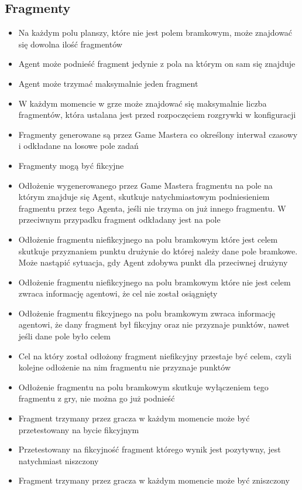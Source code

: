 \documentclass[Dokumentacja.tex]{subfiles}
\begin{document}
\subsection{Fragmenty}
\begin{itemize}
    \item Na każdym polu planszy, które nie jest polem bramkowym, może znajdować się dowolna ilość fragmentów
	\item Agent może podnieść fragment jedynie z pola na którym on sam się znajduje
    \item Agent może trzymać maksymalnie jeden fragment
    \item W każdym momencie w grze może znajdować się maksymalnie liczba fragmentów, która ustalana jest przed rozpoczęciem rozgrywki w konfiguracji
    \item Fragmenty generowane są przez Game Mastera co określony interwał czasowy i odkładane na losowe pole zadań
	\item Fragmenty mogą być fikcyjne
    \item Odłożenie wygenerowanego przez Game Mastera fragmentu na pole na którym znajduje się Agent, skutkuje natychmiastowym podniesieniem fragmentu przez tego Agenta, jeśli nie trzyma on już innego fragmentu. W przeciwnym przypadku fragment odkładany jest na pole
    \item Odłożenie fragmentu niefikcyjnego na polu bramkowym które jest celem skutkuje przyznaniem punktu drużynie do której należy dane pole bramkowe. Może nastąpić sytuacja, gdy Agent zdobywa punkt dla przeciwnej drużyny
    \item Odłożenie fragmentu niefikcyjnego na polu bramkowym które nie jest celem zwraca informację agentowi, że cel nie został osiągnięty
	\item Odłożenie fragmentu fikcyjnego na polu bramkowym zwraca informację agentowi, że dany fragment był fikcyjny oraz nie przyznaje punktów, nawet jeśli dane pole było celem
    \item Cel na który został odłożony fragment niefikcyjny przestaje być celem, czyli kolejne odłożenie na nim fragmentu nie przyznaje punktów
    \item Odłożenie fragmentu na polu bramkowym skutkuje wyłączeniem tego fragmentu z gry, nie można go już podnieść
    \item Fragment trzymany przez gracza w każdym momencie może być przetestowany na bycie fikcyjnym
    \item Przetestowany na fikcyjność fragment którego wynik jest pozytywny, jest natychmiast niszczony
    \item Fragment trzymany przez gracza w każdym momencie może być zniszczony
\end{itemize}
\end{document}
